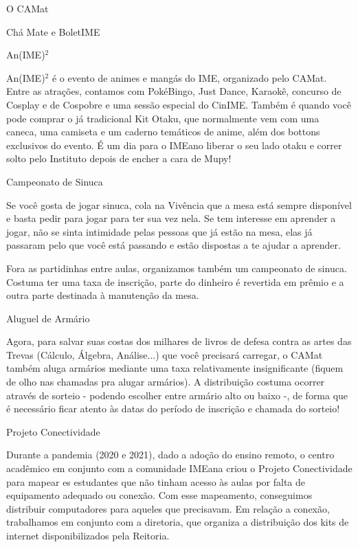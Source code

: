 \begin{secao}{O CAMat}
\begin{subsecao}{Chá Mate e BoletIME}
\end{subsecao}


\begin{subsecao}{An(IME)\texorpdfstring{$^2$}{²}}

An(IME)$^2$ é o evento de animes e mangás do IME, organizado pelo CAMat. Entre as atrações,
contamos com PokéBingo, Just Dance, Karaokê, concurso de Cosplay e de Cospobre e uma sessão 
especial do CinIME.
Também é quando você pode comprar o já tradicional Kit Otaku, que normalmente vem com uma
caneca, uma camiseta e um caderno temáticos de anime, além dos bottons exclusivos do evento.
É um dia para o IMEano liberar o seu lado otaku e correr solto pelo Instituto depois de
encher a cara de Mupy!

\end{subsecao}

\begin{subsecao}{Campeonato de Sinuca}

Se você gosta de jogar sinuca, cola na Vivência que a mesa está sempre disponível
e basta pedir para jogar para ter sua vez nela. Se tem interesse em aprender a jogar,
não se sinta intimidade pelas pessoas que já estão na mesa, elas já passaram pelo
que você está passando e estão dispostas a te ajudar a aprender.

Fora as partidinhas entre aulas, organizamos também um campeonato de sinuca. Costuma
ter uma taxa de inscrição, parte do dinheiro é revertida em prêmio e a outra parte
destinada à manutenção da mesa.

\end{subsecao}


\begin{subsecao}{Aluguel de Armário}

Agora, para salvar suas costas dos milhares de livros de defesa contra as artes
das Trevas (Cálculo, Álgebra, Análise...) que você precisará carregar, o CAMat
também aluga armários mediante uma taxa relativamente insignificante (fiquem de olho
nas chamadas pra alugar armários). A distribuição costuma ocorrer através de sorteio -
podendo escolher entre armário alto ou baixo -, de forma que é necessário ficar atento
às datas do período de inscrição e chamada do sorteio!

\end{subsecao}

\begin{subsecao}{Projeto Conectividade}

Durante a pandemia (2020 e 2021), dado a adoção do ensino remoto, o centro acadêmico em conjunto 
com a comunidade IMEana criou o Projeto Conectividade para mapear es estudantes que não tinham acesso
às aulas por falta de equipamento adequado ou conexão. Com esse mapeamento, conseguimos distribuir computadores para aqueles que
precisavam. Em relação a conexão, trabalhamos em conjunto com a diretoria, que organiza a distribuição dos 
kits de internet disponibilizados pela Reitoria.


\end{subsecao}
\end{secao}
